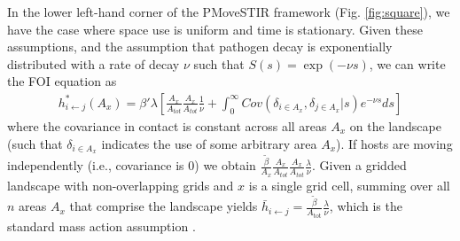 \documentclass[letterpaper]{article}
\begin{document}
In the lower left-hand corner of the PMoveSTIR framework (Fig. \ref{fig:square}), we have the case where space use is uniform and time is stationary. 
Given these assumptions, and the assumption that pathogen decay is exponentially distributed with a rate of decay $\nu$ such that $S(s) = \exp(-\nu s)$, we can write the FOI equation as
\begin{equation}
    \begin{aligned}
        h^*_{i \leftarrow j}(A_x) = \beta' \lambda \left[\frac{A_x}{A_{tot}}\frac{A_x}{A_{tot}} \frac{1}{\nu} +  \int_{0}^{\infty} Cov(\delta_{i \in A_x}, \delta_{j \in A_x} | s) e^{-\nu s} ds\right]
    \end{aligned}
    \label{eq:uniform_stationary1}
\end{equation}
where the covariance in contact is constant across all areas $A_x$ on the landscape (such that $\delta_{i \in A_x}$ indicates the use of some arbitrary area $A_x$).  
If hosts are moving independently (i.e., covariance is 0) we obtain $\frac{\tilde{\beta}}{A_x} \frac{A_x}{A_{tot}} \frac{A_x}{A_{tot}}  \frac{\lambda}{\nu}$. Given a gridded landscape with non-overlapping grids and $x$ is a single grid cell, summing over all $n$ areas $A_x$ that comprise the landscape yields $\bar{h}_{i \leftarrow j} =\frac{\tilde{\beta}}{A_\text{tot}} \frac{\lambda}{\nu}$, which is the standard mass action assumption \citep{McCallum2001}. 
\end{document}
